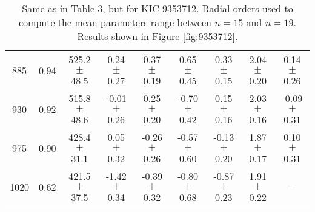 \documentclass[twocolumn]{aastex61}%
\begin{document}
\begin{table*}[ht]
\begin{tabular}{ccc|ccccc|c}
885 & 0.94 & 525.2 $\pm$ 48.5 & 0.24 $\pm$ 0.27 & 0.37 $\pm$ 0.19 & 0.65 $\pm$ 0.45 & 0.33 $\pm$ 0.15 & 2.04 $\pm$ 0.20 & 0.14 $\pm$ 0.26\\
930 & 0.92 & 515.8 $\pm$ 48.6 & -0.01 $\pm$ 0.26 & 0.25 $\pm$ 0.20 & -0.70 $\pm$ 0.42 & 0.15 $\pm$ 0.16 & 2.03 $\pm$ 0.16 & -0.09 $\pm$ 0.31\\
975 & 0.90 & 428.4 $\pm$ 31.1 & 0.05 $\pm$ 0.32 & -0.26 $\pm$ 0.26 & -0.57 $\pm$ 0.60 & -0.13 $\pm$ 0.20 & 1.87 $\pm$ 0.17 & 0.10 $\pm$ 0.31\\
1020 & 0.62 & 421.5 $\pm$ 37.5 & -1.42 $\pm$ 0.34 & -0.39 $\pm$ 0.32 & -0.80 $\pm$ 0.68 & -0.87 $\pm$ 0.23 & 1.91 $\pm$ 0.22 & --\\
\end{tabular}
\caption{Same as in Table 3, but for KIC 9353712. Radial orders used to compute the mean parameters range between $n=15$ and $n=19$. Results shown in Figure \ref{fig:9353712}.}\label{tab:9353712}
\end{table*}
\end{document}
